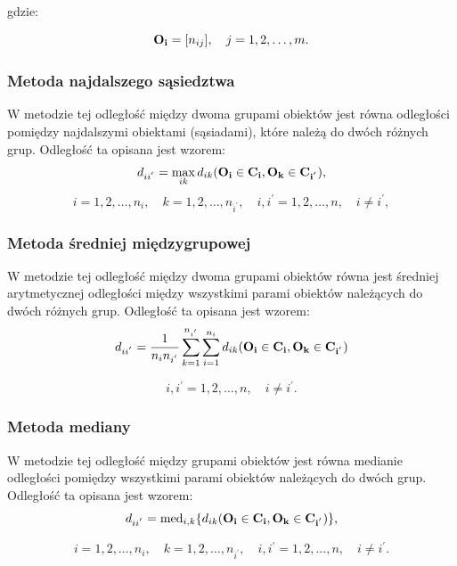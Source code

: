 \documentclass[12pt,a4paper]{report}
\newcommand{\mediana}{\operatorname{med}}
\begin{document}
gdzie:

$$
\bold{O_{i}}=[n_{ij}], \quad j=1,2,\dots,m.
$$

\subsubsection{Metoda najdalszego sąsiedztwa}


W metodzie tej odległość między dwoma grupami obiektów jest równa odległości pomiędzy najdalszymi obiektami (sąsiadami), które należą do dwóch różnych grup. Odległość ta opisana jest wzorem: 
$$
d_{ii^{'}}= \max\limits_{ik} {d_{ik}(\bf{O_i} \in C_{i}, O_{k} \in C_{i^{'}})},
$$
$$
i=1,2,\dots,n_{i}, \quad k=1,2,\dots,n_{i^{'}}, \quad i,i^{'}=1,2,\dots,n, \quad i \neq i^{'}, 
$$


\subsubsection{Metoda średniej międzygrupowej}


W metodzie tej odległość między dwoma grupami obiektów równa jest średniej arytmetycznej odległości między wszystkimi parami obiektów należących do dwóch różnych grup. Odległość ta opisana jest wzorem: 
$$
d_{ii^{'}}=\frac{1}{n_{i}n_{i^{'}}}\sum_{k=1}^{n_{i^{'}}}\sum_{i=1}^{n_{i}} d_{ik}(\bf{O_i} \in C_{i}, O_{k} \in C_{i^{'}})
$$

$$i,i^{'}=1,2,\dots,n, \quad i \neq i^{'}. $$


\subsubsection{Metoda mediany}


W metodzie tej odległość między grupami obiektów jest równa medianie odległości pomiędzy wszystkimi parami obiektów należących do dwóch grup. Odległość ta opisana jest wzorem: 
$$
d_{ii^{'}}= \mediana_{i,k} \{d_{ik}(\bf{O_i} \in C_{i}, O_{k} \in C_{i^{'}})\},
$$

$$i=1,2,\dots,n_{i}, \quad k=1,2,\dots,n_{i^{'}}, \quad i,i^{'}=1,2,\dots,n, \quad i \neq i^{'}. $$
\end{document}
